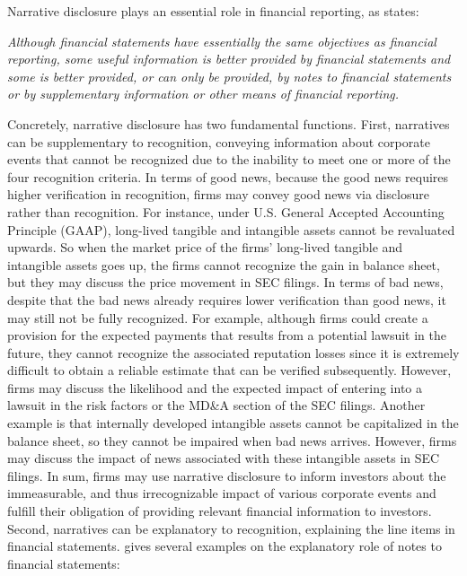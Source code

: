 \documentclass[a4paper]{article}
\begin{document}
\begin{spacing}{2}
Narrative disclosure plays an essential role in financial reporting, as  states:
\begin{singlespace}
	\indent \textit{Although financial statements have essentially the same objectives as financial reporting, some useful information is better provided by financial statements and some is better provided, or can only be provided, by notes to financial statements or by supplementary information or other means of financial reporting.}
\end{singlespace}
Concretely, narrative disclosure has two fundamental functions. First, narratives can be supplementary to recognition, conveying information about corporate events that cannot be recognized due to the inability to meet one or more of the four recognition criteria. In terms of good news, because the good news requires higher verification in recognition, firms may convey good news via disclosure rather than recognition. For instance, under U.S. General Accepted Accounting Principle (GAAP), long-lived tangible and intangible assets cannot be revaluated upwards. So when the market price of the firms' long-lived tangible and intangible assets goes up, the firms cannot recognize the gain in balance sheet, but they may discuss the price movement in SEC filings. In terms of bad news, despite that the bad news already requires lower verification than good news, it may still not be fully recognized. For example, although firms could create a provision for the expected payments that results from a potential lawsuit in the future, they cannot recognize the associated reputation losses since it is extremely difficult to obtain a reliable estimate that can be verified subsequently. However, firms may discuss the likelihood and the expected impact of entering into a lawsuit in the risk factors or the MD\&A section of the SEC filings. Another example is that internally developed intangible assets cannot be capitalized in the balance sheet, so they cannot be impaired when bad news arrives. However, firms may discuss the impact of news associated with these intangible assets in SEC filings. In sum, firms may use narrative disclosure to inform investors about the immeasurable, and thus irrecognizable impact of various corporate events and fulfill their obligation of providing relevant financial information to investors. Second, narratives can be explanatory to recognition, explaining the line items in financial statements.  gives several examples on the explanatory role of notes to financial statements:


\end{spacing}
\end{document}
